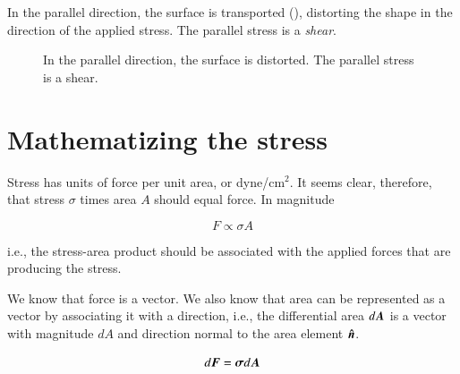 In the parallel direction, the surface is transported
(), distorting the
shape in the direction of the applied stress. The parallel stress is a
{\it shear}. 

\begin{figure}
  \begin{center}
  \end{center}
  \caption[]{In the parallel direction, the surface is distorted. The
    parallel stress is a shear.}
  \label{fig:tensor3}
\end{figure}

\section{Mathematizing the stress} 

Stress has units of force per unit area, or dyne/cm$^2$. It seems clear, therefore, that stress $\sigma$ times area $A$ should equal force. In magnitude 

\begin{equation}
F \propto \sigma A 
\end{equation}

\noindent i.e., the stress-area product should be associated with the applied forces that are producing the stress. 


We know that force is a vector. We also know that area can be represented as a vector by associating it with a direction, i.e., the differential area $d{\boldsymbol{A}}$ is a vector with magnitude $dA$ and direction normal to the area element ${\boldsymbol{\hat{n}}}$.


\begin{equation}
d{\boldsymbol{F}} = \boldsymbol{\mathrm{\sigma}} d{\boldsymbol{A}}  
\end{equation}


